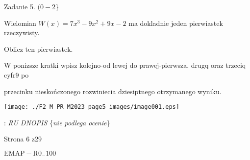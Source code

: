 \documentclass[a4paper,12pt]{article}
\begin{document}
Zadanie 5. $(0-2$\}

Wielomian $W(x)=7x^{3}-9x^{2}+9x-2$ ma dokladnie jeden pierwiastek rzeczywisty.

Oblicz ten pierwiastek.

$\mathrm{W}$ ponizsze kratki wpisz kolejno-od lewej do prawej-pierwsza, drugq oraz trzeciq cyfr9 po

przecinku nieskończonego rozwiniecia dziesiptnego otrzymanego wyniku.
\begin{center}
\texttt{[image: ./F2\_M\_PR\_M2023\_page5\_images/image001.eps]}
\end{center}
: {\it RU DNOPIS} \{{\it nie podlega ocenie}\}

Strona 6 z29

$\mathrm{E}\mathrm{M}\mathrm{A}\mathrm{P}-\mathrm{R}0_{-}100$
\end{document}
